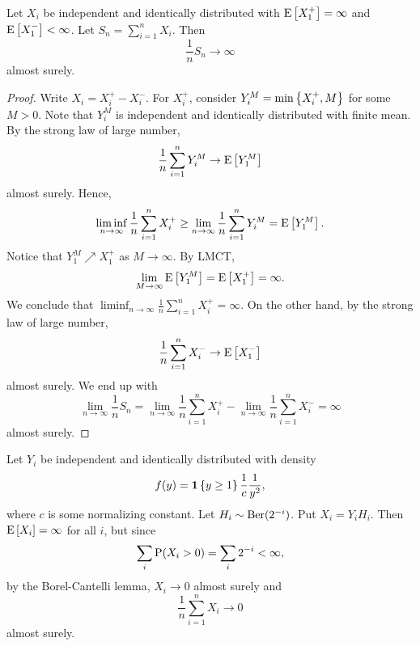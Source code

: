 \begin{theorem}
    Let $X_i$ be independent and identically distributed with $\E\sbrc{X_1^+} = \infty$ 
    and $\E\sbrc{X_1^-} <\infty$. Let $S_n = \sum_{i=1}^n X_i$. Then 
    \begin{equation*}
        \frac{1}{n}S_n \to \infty 
    \end{equation*}
    almost surely. 
\end{theorem}
\begin{proof}
    Write $X_i = X_i^+ - X_i^-$. For $X_i^+$, consider $Y_i^M = \min\set{X_i^+, M}$ 
    for some $M>0$. Note that $Y_i^M$ is independent and identically distributed with 
    finite mean. By the strong law of large number, 
    \begin{equation*}
        \frac{1}{n}\sum_{i=1}^nY_i^M\to \E\sbrc{Y_1^M}
    \end{equation*}
    almost surely. Hence, 
    \begin{equation*}
        \liminf_{n\to\infty}\frac{1}{n}\sum_{i=1}^nX_i^+ \geq \lim_{n\to\infty}\frac{1}{n}\sum_{i=1}^nY_i^M = \E\sbrc{Y_1^M}. 
    \end{equation*}
    Notice that $Y_1^M\nearrow X_1^+$ as $M\to\infty$. By LMCT, 
    \begin{equation*}
        \lim_{M\to\infty}\E\sbrc{Y_1^M} = \E\sbrc{X_1^+} = \infty. 
    \end{equation*}
    We conclude that $\liminf_{n\to\infty}\frac{1}{n}\sum_{i=1}^nX_i^+ = \infty$. 
    On the other hand, by the strong law of large number, 
    \begin{equation*}
        \frac{1}{n}\sum_{i=1}^nX_i^-\to\E\sbrc{X_1^-}
    \end{equation*}
    almost surely. We end up with 
    \begin{equation*}
        \lim_{n\to\infty} \frac{1}{n}S_n = \lim_{n\to\infty}\frac{1}{n}\sum_{i=1}^nX_i^+ - \lim_{n\to\infty}\frac{1}{n}\sum_{i=1}^nX_i^- 
        = \infty
    \end{equation*}
    almost surely. 
\end{proof}

\begin{example}
    Let $Y_i$ be independent and identically distributed with density 
    \begin{equation*}
        f(y) = \one\set{y\geq 1}\frac{1}{c}\frac{1}{y^2}, 
    \end{equation*}
    where $c$ is some normalizing constant. Let $H_i\sim \Ber(2^{-i})$. 
    Put $X_i = Y_iH_i$. Then $\E\sbrc{X_i} = \infty$ for all $i$, but  
    since 
    \begin{equation*}
        \sum_i \P(X_i > 0) = \sum_i 2^{-i} <\infty, 
    \end{equation*}
    by the Borel-Cantelli lemma, $X_i\to 0$ almost surely 
    and 
    \begin{equation*}
        \frac{1}{n}\sum_{i=1}^n X_i \to 0
    \end{equation*} 
    almost surely. 
\end{example}

